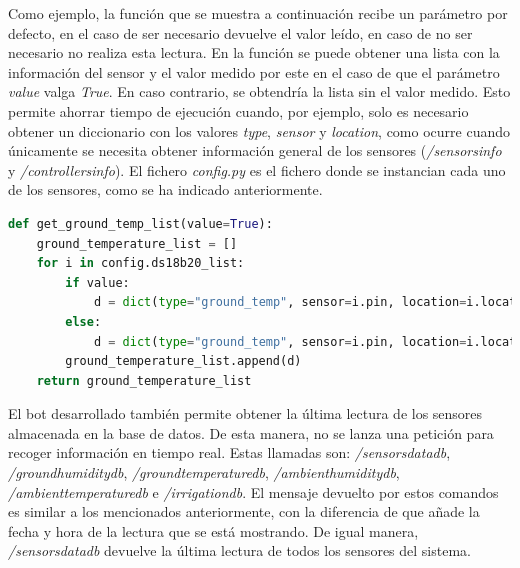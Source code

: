 \documentclass[a4paper, 12pt, oneside]{book}
\begin{document}
Como ejemplo, la función que se muestra a continuación recibe un parámetro por defecto, en el caso de ser necesario devuelve el valor leído, en caso de no ser necesario no realiza esta lectura.
En la función se puede obtener una lista con la información del sensor y el valor medido por este en el caso de que el parámetro \textit{value} valga \textit{True}. En caso contrario, se obtendría la lista sin el valor medido. 
Esto permite ahorrar tiempo de ejecución cuando, por ejemplo, solo es necesario obtener un diccionario con los valores \textit{type}, \textit{sensor} y \textit{location}, como ocurre cuando únicamente se necesita obtener información general de los sensores (\textit{/sensorsinfo} y \textit{/controllersinfo}).
El fichero \textit{config.py} es el fichero donde se instancian cada uno de los sensores, como se ha indicado anteriormente.

\begin{lstlisting}[language=Python]
def get_ground_temp_list(value=True):
    ground_temperature_list = []
    for i in config.ds18b20_list:
        if value:
            d = dict(type="ground_temp", sensor=i.pin, location=i.location, 		value=read_ground_temperature(i.pin))
        else:
            d = dict(type="ground_temp", sensor=i.pin, location=i.location)
        ground_temperature_list.append(d)
    return ground_temperature_list
\end{lstlisting}

El bot desarrollado también permite obtener la última lectura de los sensores almacenada en la base de datos. De esta manera, no se lanza una petición para recoger información en tiempo real. Estas llamadas son: \textit{/sensorsdatadb}, \textit{/groundhumiditydb}, \textit{/groundtemperaturedb}, \textit{/ambienthumiditydb}, \textit{/ambienttemperaturedb} e \textit{/irrigationdb}. El mensaje devuelto por estos comandos es similar a los mencionados anteriormente, con la diferencia de que añade la fecha y hora de la lectura que se está mostrando. De igual manera, \textit{/sensorsdatadb} devuelve la última lectura de todos los sensores del sistema.
\end{document}
